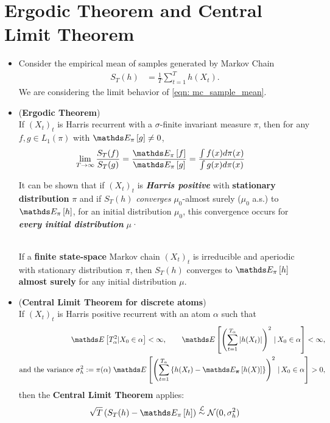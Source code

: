 \documentclass[11pt]{article}
\begin{document}
\section{Ergodic Theorem and Central Limit Theorem}
\begin{itemize}
\item Consider the empirical mean of samples generated by Markov Chain
\begin{align}
S_T(h) &= \frac{1}{T}\sum_{t=1}^{T}h(X_t).  \label{eqn: mc_sample_mean}
\end{align} We are considering the limit behavior of \eqref{eqn: mc_sample_mean}. 

\item 
\begin{theorem} (\textbf{Ergodic Theorem})  \citep{robert1999monte} \\
If $(X_t)_t$ is Harris recurrent with a $\sigma$-finite invariant measure $\pi$, then for any $f, g \in L_1(\pi)$ with $\E{\pi}{g} \neq 0$, 
\begin{align}
\lim_{T\rightarrow \infty}\frac{S_T(f)}{S_T(g)} &= \frac{\E{\pi}{f}}{\E{\pi}{g}} = \frac{\int f(x)d\pi(x)}{\int g(x)d\pi(x)} \label{eqn: ergodic theorem}
\end{align}
\end{theorem}
It can be shown that if $(X_t)_t$  is \emph{\textbf{Harris positive}} with \textbf{stationary distribution} $\pi$ and if $S_T(h)$ \emph{converges} $\mu_0$-almost surely ($\mu_0$ a.s.) to $\E{\pi}{h}$, for an initial distribution $\mu_0$, this convergence occurs for \emph{\textbf{every initial distribution}} $\mu$·

\begin{corollary}\citep{liu2001monte}\\
If a \textbf{finite state-space} Markov chain $(X_t)_t$ is irreducible and aperiodic with stationary distribution $\pi$, then $S_T(h)$ converges to $\E{\pi}{h}$ \textbf{almost surely} for any initial distribution $\mu$.
\end{corollary}


\item \begin{theorem}(\textbf{Central Limit Theorem for discrete atoms})\\
If $(X_t)_t$ is Harris positive recurrent with an atom $\alpha$ such that
\begin{align*}
\E{}{T^2_{\alpha} | X_0 \in \alpha} < \infty, \qquad \E{}{\paren{\sum_{t=1}^{T_{\alpha}}\abs{h(X_t)}}^2 \,|\, X_0 \in \alpha} < \infty, \\
\text{and the variance }\sigma_{h}^2:= \pi(\alpha)\;\E{}{\paren{\sum_{t=1}^{T_{\alpha}}\set{h(X_t) - \E{\mb{\pi}}{h(X)}}}^2 \,|\, X_0\in \alpha} > 0,
\end{align*}
then the \textbf{Central Limit Theorem} applies:
\begin{align}
\sqrt{T}\paren{S_T(h) - \E{\pi}{h}} \stackrel{\cL}{\sim} \cN(0, \sigma_{h}^2) \label{eqn: mc_clt_discrete}
\end{align} 
\end{theorem}


\end{itemize}
\end{document}
